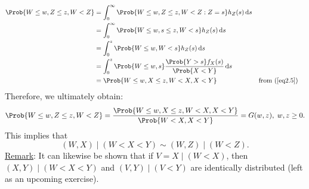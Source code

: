 \begin{Example}
\begin{align*}
        \Prob{W\le w,Z\le z,W<Z}
         & =\int_{0}^{\infty}\Prob{W\le w,Z\le z,W<Z\given Z=s}h_Z(s)\odif{s}                                           \\
         & =\int_{0}^{\infty}\Prob{W\le w, s\le z,W<s}h_Z(s)\odif{s}                                                    \\
         & =\int_{0}^{z}\Prob{W\le w,W<s}h_Z(s)\odif{s}                                                                 \\
         & =\int_{0}^{z}\Prob{W\le \min{w,s}}\frac{\Prob{Y>s}f_X(s)}{\Prob{X<Y}}\odif{s}                                \\
         & =\Prob{W\le w,X\le z,W<X,X<Y}                                                 &  & \text{from (\ref{eq2.5})}
    \end{align*}
    Therefore, we ultimately obtain:
    \[ \Prob{W\le w,Z\le z,W<Z}=\frac{\Prob{W\le w,X\le z,W<X,X<Y}}{\Prob{W<X,X<Y}}=G(w,z),\; w,z\ge 0. \]
    This implies that
    \[ (W,X)\mid (W<X<Y) \sim (W,Z)\mid (W<Z). \]
    \underline{Remark}: It can likewise be shown that if $ V=X\mid(W<X) $, then $ (X,Y)\mid(W<X<Y) $ and
    $ (V,Y)\mid(V<Y) $ are identically distributed (left as an upcoming exercise).
\end{Example}
